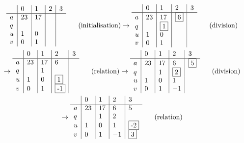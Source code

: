 \begin{multline*}
\begin{array}{l|l|l|l|l}
 & 0 & 1 & 2 & 3 \\ \hline
a & 23 & 17 &  &  \\ 
q &    &    &  &  \\ 
u & 1  & 0  &  &  \\
v & 0  & 1  &  & 
\end{array}\hspace{0.5cm} \text{ (initialisation)}
\rightarrow
\begin{array}{l|l|l|l|l}
  & 0  & 1        & 2 & 3  \\ \hline
a & 23 & 17       & \fbox{6} &  \\ 
q &    & \fbox{1} &   &  \\ 
u & 1  & 0        &   &  \\
v & 0  & 1        &   & 
\end{array}
\hspace{0.5cm} \text{ (division)}\\
\rightarrow
\begin{array}{l|l|l|l|l}
  & 0  & 1  & 2         & 3  \\ \hline
a & 23 & 17 & 6         &  \\ 
q &    & 1  &           &  \\ 
u & 1  & 0  & \fbox{1}  &  \\
v & 0  & 1  & \fbox{-1} & 
\end{array}\hspace{0.5cm} \text{ (relation)}
\rightarrow
\begin{array}{l|l|l|l|l}
  & 0  & 1  & 2         & 3  \\ \hline
a & 23 & 17 & 6         & \fbox{5} \\ 
q &    & 1  & \fbox{2}  &  \\ 
u & 1  & 0  & 1         &  \\
v & 0  & 1  & -1        & 
\end{array}\hspace{0.5cm} \text{ (division)}\\
\rightarrow
\begin{array}{l|l|l|l|l}
  & 0  & 1  & 2  & 3  \\ \hline
a & 23 & 17 & 6  & 5   \\ 
q &    & 1  & 2  &            \\ 
u & 1  & 0  & 1  &  \fbox{-2} \\
v & 0  & 1  & -1 &  \fbox{3}
\end{array}\hspace{0.5cm} \text{ (relation)}

\end{multline*}

